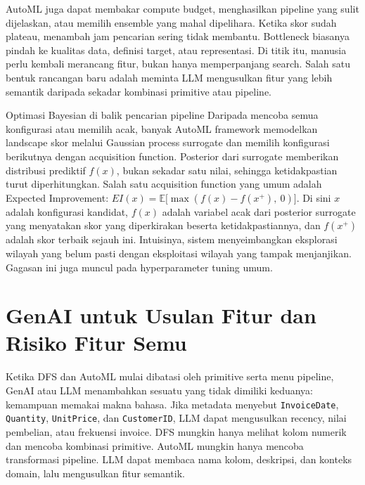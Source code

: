 AutoML juga dapat membakar compute budget, menghasilkan pipeline yang sulit dijelaskan, atau memilih ensemble yang mahal dipelihara. Ketika skor sudah plateau, menambah jam pencarian sering tidak membantu. Bottleneck biasanya pindah ke kualitas data, definisi target, atau representasi. Di titik itu, manusia perlu kembali merancang fitur, bukan hanya memperpanjang search. Salah satu bentuk rancangan baru adalah meminta LLM mengusulkan fitur yang lebih semantik daripada sekadar kombinasi primitive atau pipeline.

\begin{pendalaman}{Optimasi Bayesian di balik pencarian pipeline}
Daripada mencoba semua konfigurasi atau memilih acak, banyak AutoML framework memodelkan landscape skor melalui Gaussian process surrogate dan memilih konfigurasi berikutnya dengan acquisition function. Posterior dari surrogate memberikan distribusi prediktif \(f(x)\), bukan sekadar satu nilai, sehingga ketidakpastian turut diperhitungkan. Salah satu acquisition function yang umum adalah Expected Improvement: \(EI(x) = \mathbb{E}\big[\max(f(x) - f(x^{+}),\ 0)\big]\). Di sini \(x\) adalah konfigurasi kandidat, \(f(x)\) adalah variabel acak dari posterior surrogate yang menyatakan skor yang diperkirakan beserta ketidakpastiannya, dan \(f(x^{+})\) adalah skor terbaik sejauh ini. Intuisinya, sistem menyeimbangkan eksplorasi wilayah yang belum pasti dengan eksploitasi wilayah yang tampak menjanjikan. Gagasan ini juga muncul pada hyperparameter tuning umum.
\end{pendalaman}

\section{GenAI untuk Usulan Fitur dan Risiko Fitur Semu}\label{genai-untuk-usulan-fitur-dan-risiko-fitur-semu}

Ketika DFS dan AutoML mulai dibatasi oleh primitive serta menu pipeline, GenAI atau LLM menambahkan sesuatu yang tidak dimiliki keduanya: kemampuan memakai makna bahasa. Jika metadata menyebut \passthrough{\lstinline!InvoiceDate!}, \passthrough{\lstinline!Quantity!}, \passthrough{\lstinline!UnitPrice!}, dan \passthrough{\lstinline!CustomerID!}, LLM dapat mengusulkan recency, nilai pembelian, atau frekuensi invoice. DFS mungkin hanya melihat kolom numerik dan mencoba kombinasi primitive. AutoML mungkin hanya mencoba transformasi pipeline. LLM dapat membaca nama kolom, deskripsi, dan konteks domain, lalu mengusulkan fitur semantik.

